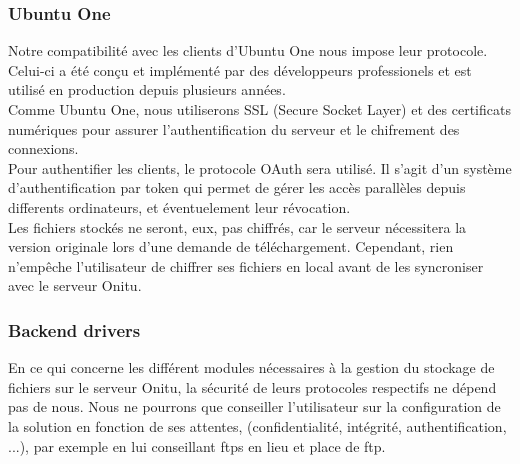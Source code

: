 \subsubsection{Ubuntu One}
Notre compatibilité avec les clients d'Ubuntu One nous impose leur protocole. Celui-ci a été conçu et implémenté par des développeurs professionels et est utilisé en production depuis plusieurs années.\\
Comme Ubuntu One, nous utiliserons SSL (Secure Socket Layer) et des certificats numériques pour assurer l'authentification du serveur et le chifrement des connexions.\\
Pour authentifier les clients, le protocole OAuth sera utilisé. Il s'agit d'un système d'authentification par token qui permet de gérer les accès parallèles depuis differents ordinateurs, et éventuelement leur révocation.\\
Les fichiers stockés ne seront, eux, pas chiffrés, car le serveur nécessitera la version originale lors d'une demande de téléchargement. Cependant, rien n'empêche l'utilisateur de chiffrer ses fichiers en local avant de les syncroniser avec le serveur Onitu.

\subsubsection{Backend drivers}
En ce qui concerne les différent modules nécessaires à la gestion du stockage de fichiers sur le serveur Onitu, la sécurité de leurs protocoles respectifs ne dépend pas de nous. Nous ne pourrons que conseiller l'utilisateur sur la configuration de la solution en fonction de ses attentes, (confidentialité, intégrité, authentification, ...), par exemple en lui conseillant ftps en lieu et place de ftp.
